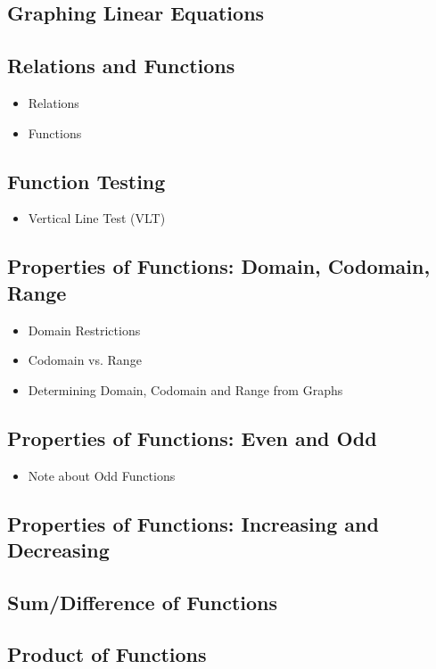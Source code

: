 \documentclass[11pt]{article}
\begin{document}
\subsection{Graphing Linear Equations}
\subsection{Relations and Functions}
\begin{itemize}
    \item Relations
    \item Functions
\end{itemize}
\subsection{Function Testing}
\begin{itemize}
    \item Vertical Line Test (VLT)
\end{itemize}
\subsection{Properties of Functions: Domain, Codomain, Range}
\begin{itemize}
    \item Domain Restrictions
    \item Codomain vs. Range
    \item Determining Domain, Codomain and Range from Graphs
\end{itemize}
\subsection{Properties of Functions: Even and Odd}
\begin{itemize}
    \item Note about Odd Functions
\end{itemize}
\subsection{Properties of Functions: Increasing and Decreasing}
\subsection{Sum/Difference of Functions}
\subsection{Product of Functions}
\end{document}
